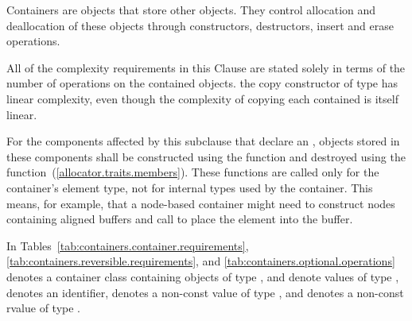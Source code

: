 \pnum
Containers are objects that store other objects.
They control allocation and deallocation of these objects
through constructors, destructors, insert and erase operations.

\pnum
All of the complexity requirements in this Clause are stated solely
in terms of the number of operations on the contained objects.
\enterexample
the copy constructor of type
has linear complexity,
even though the complexity of copying each contained
is itself linear.
\exitexample

\pnum
For the components affected by this subclause that declare an , objects
stored in these components shall be constructed using
the  function and destroyed using the
function~(\ref{allocator.traits.members}). These functions are called only for the
container's element type, not for internal types used by the container. \enternote This
means, for example, that a node-based container might need to construct nodes containing
aligned buffers and call  to place the element into the buffer.
\exitnote

\pnum
In Tables~\ref{tab:containers.container.requirements},
\ref{tab:containers.reversible.requirements}, and
\ref{tab:containers.optional.operations}
 denotes a container class containing objects of type
,  and 
denote values of type , 
denotes an identifier,  denotes
a non-const value of type , and 
denotes a non-const rvalue of type .

